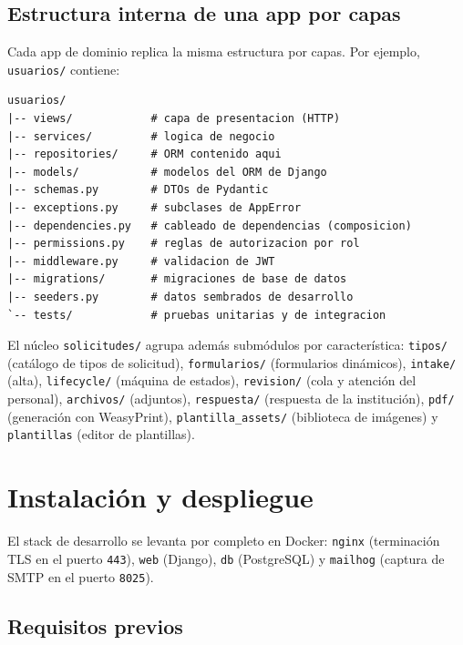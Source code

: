 \documentclass[12pt,letterpaper]{report}
\begin{document}
\section{Estructura interna de una app por capas}

Cada app de dominio replica la misma estructura por capas. Por ejemplo,
\texttt{usuarios/} contiene:

\begin{lstlisting}
usuarios/
|-- views/            # capa de presentacion (HTTP)
|-- services/         # logica de negocio
|-- repositories/     # ORM contenido aqui
|-- models/           # modelos del ORM de Django
|-- schemas.py        # DTOs de Pydantic
|-- exceptions.py     # subclases de AppError
|-- dependencies.py   # cableado de dependencias (composicion)
|-- permissions.py    # reglas de autorizacion por rol
|-- middleware.py     # validacion de JWT
|-- migrations/       # migraciones de base de datos
|-- seeders.py        # datos sembrados de desarrollo
`-- tests/            # pruebas unitarias y de integracion
\end{lstlisting}

El núcleo \texttt{solicitudes/} agrupa además submódulos por característica:
\texttt{tipos/} (catálogo de tipos de solicitud), \texttt{formularios/}
(formularios dinámicos), \texttt{intake/} (alta), \texttt{lifecycle/} (máquina de
estados), \texttt{revision/} (cola y atención del personal), \texttt{archivos/}
(adjuntos), \texttt{respuesta/} (respuesta de la institución), \texttt{pdf/}
(generación con WeasyPrint), \texttt{plantilla\_assets/} (biblioteca de imágenes)
y \texttt{plantillas} (editor de plantillas).

\chapter{Instalación y despliegue}

El stack de desarrollo se levanta por completo en Docker: \texttt{nginx}
(terminación TLS en el puerto \texttt{443}), \texttt{web} (Django), \texttt{db}
(PostgreSQL) y \texttt{mailhog} (captura de SMTP en el puerto \texttt{8025}).

\section{Requisitos previos}
\end{document}
